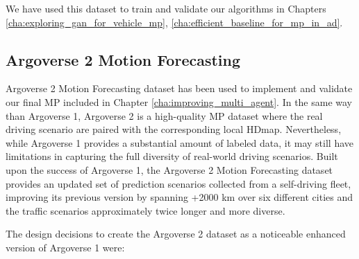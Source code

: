We have used this dataset to train and validate our algorithms in Chapters \ref{cha:exploring_gan_for_vehicle_mp}, \ref{cha:efficient_baseline_for_mp_in_ad}.

\subsection{Argoverse 2 Motion Forecasting}
\label{subsec:2_argoverse_2}

Argoverse 2 \cite{wilson2023argoverse} Motion Forecasting dataset has been used to implement and validate our final \ac{MP} included in Chapter \ref{cha:improving_multi_agent}. In the same way than Argoverse 1, Argoverse 2 is a high-quality \ac{MP} dataset where the real driving scenario are paired with the corresponding local \ac{HDmap}. Nevertheless, while Argoverse 1 provides a substantial amount of labeled data, it may still have limitations in capturing the full diversity of real-world driving scenarios. Built upon the success of Argoverse 1, the Argoverse 2 Motion Forecasting dataset provides an updated set of prediction scenarios collected from a self-driving fleet, improving its previous version by spanning +2000 km over six different cities and the traffic scenarios approximately twice longer and more diverse.

\begin{comment}
\begin{figure}[h]
	\centering
	\texttt{[image: chapter\_2\_related\_works/mp\_mf\_score\_plateau.pdf]}
	\caption[MinFDE metric values for submissions on Argoverse 1 over time]{MinFDE metric values for submissions on Argoverse 1 over time. Individual points indicate submissions to the public leader board. Colors indicate specific competition phases. The solid black line indicates SOTA performance}
	\label{fig:chapter_2_related_works/mp_mf_score_plateau}
\end{figure}
\end{comment}
	
The design decisions \cite{wilson2023argoverse} to create the Argoverse 2 dataset as a noticeable enhanced version of Argoverse 1 were:


